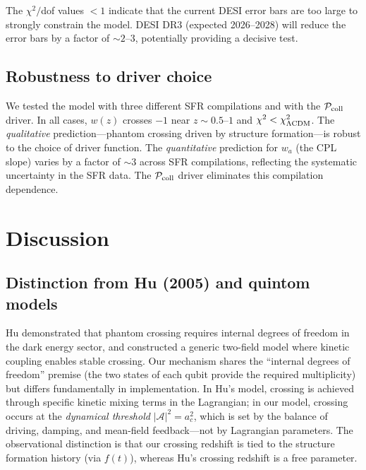 \documentclass[aps,prd,twocolumn,superscriptaddress]{revtex4-2}
\begin{document}
The $\chi^2/$dof values $< 1$ indicate that the current DESI error bars are too large to strongly constrain the model. DESI DR3 (expected 2026--2028) will reduce the error bars by a factor of $\sim 2$--$3$, potentially providing a decisive test.

\subsection{Robustness to driver choice}

We tested the model with three different SFR compilations \cite{Madau:2014,Behroozi:2019,Driver:2018} and with the $\mathcal{P}_{\rm coll}$ driver. In all cases, $w(z)$ crosses $-1$ near $z \sim 0.5$--$1$ and $\chi^2 < \chi^2_{\Lambda{\rm CDM}}$. The \emph{qualitative} prediction---phantom crossing driven by structure formation---is robust to the choice of driver function. The \emph{quantitative} prediction for $w_a$ (the CPL slope) varies by a factor of $\sim 3$ across SFR compilations, reflecting the systematic uncertainty in the SFR data. The $\mathcal{P}_{\rm coll}$ driver eliminates this compilation dependence.

\section{Discussion}
\label{sec:discussion}

\subsection{Distinction from Hu (2005) and quintom models}

Hu \cite{Hu:2005} demonstrated that phantom crossing requires internal degrees of freedom in the dark energy sector, and constructed a generic two-field model where kinetic coupling enables stable crossing. Our mechanism shares the ``internal degrees of freedom'' premise (the two states of each qubit provide the required multiplicity) but differs fundamentally in implementation. In Hu's model, crossing is achieved through specific kinetic mixing terms in the Lagrangian; in our model, crossing occurs at the \emph{dynamical threshold} $|\mathcal{A}|^2 = a_c^2$, which is set by the balance of driving, damping, and mean-field feedback---not by Lagrangian parameters. The observational distinction is that our crossing redshift is tied to the structure formation history (via $f(t)$), whereas Hu's crossing redshift is a free parameter.
\end{document}
